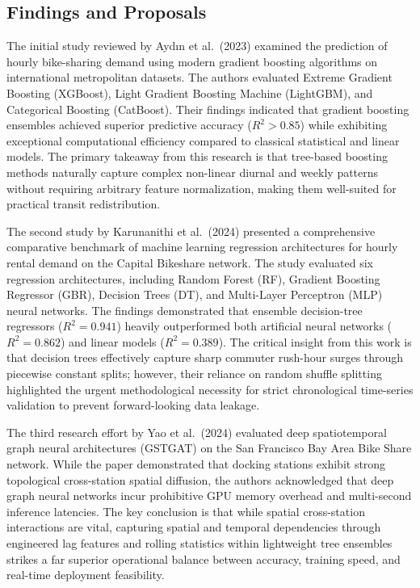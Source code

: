 \documentclass[12pt, a4paper]{article}
\renewcommand{\_}{\textunderscore\allowbreak}
\begin{document}
\subsection{Findings and Proposals}
The initial study reviewed by Ayd{\i}n et al.\ (2023) examined the prediction of hourly bike-sharing demand using modern gradient boosting algorithms on international metropolitan datasets. The authors evaluated Extreme Gradient Boosting (XGBoost), Light Gradient Boosting Machine (LightGBM), and Categorical Boosting (CatBoost). Their findings indicated that gradient boosting ensembles achieved superior predictive accuracy ($R^2 > 0.85$) while exhibiting exceptional computational efficiency compared to classical statistical and linear models. The primary takeaway from this research is that tree-based boosting methods naturally capture complex non-linear diurnal and weekly patterns without requiring arbitrary feature normalization, making them well-suited for practical transit redistribution.

The second study by Karunanithi et al.\ (2024) presented a comprehensive comparative benchmark of machine learning regression architectures for hourly rental demand on the Capital Bikeshare network. The study evaluated six regression architectures, including Random Forest (RF), Gradient Boosting Regressor (GBR), Decision Trees (DT), and Multi-Layer Perceptron (MLP) neural networks. The findings demonstrated that ensemble decision-tree regressors ($R^2 = 0.941$) heavily outperformed both artificial neural networks ($R^2 = 0.862$) and linear models ($R^2 = 0.389$). The critical insight from this work is that decision trees effectively capture sharp commuter rush-hour surges through piecewise constant splits; however, their reliance on random shuffle splitting highlighted the urgent methodological necessity for strict chronological time-series validation to prevent forward-looking data leakage.

The third research effort by Yao et al.\ (2024) evaluated deep spatiotemporal graph neural architectures (GSTGAT) on the San Francisco Bay Area Bike Share network. While the paper demonstrated that docking stations exhibit strong topological cross-station spatial diffusion, the authors acknowledged that deep graph neural networks incur prohibitive GPU memory overhead and multi-second inference latencies. The key conclusion is that while spatial cross-station interactions are vital, capturing spatial and temporal dependencies through engineered lag features and rolling statistics within lightweight tree ensembles strikes a far superior operational balance between accuracy, training speed, and real-time deployment feasibility.
\end{document}
